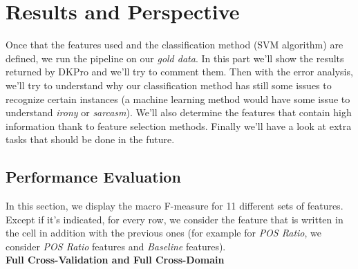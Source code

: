 \chapter{Results and Perspective}
Once that the features used and the classification method (SVM algorithm) are defined, we run the pipeline on our \emph{gold data}. In this part we'll show the results returned by DKPro and we'll try to comment them. Then with the error analysis, we'll try to understand why our classification method has still some issues to recognize certain instances (a machine learning method would have some issue to understand \emph{irony} or \emph{sarcasm}). We'll also determine the features that contain high information thank to feature selection methods. Finally we'll have a look at extra tasks that should be done in the future.
\section{Performance Evaluation}
In this section, we display the macro F-measure for 11 different sets of features. Except if it's indicated, for every row, we consider the feature that is written in the cell in addition with the previous ones (for example for \emph{POS Ratio}, we consider \emph{POS Ratio} features and \emph{Baseline} features).
\\
\textbf{Full Cross-Validation and Full Cross-Domain}
